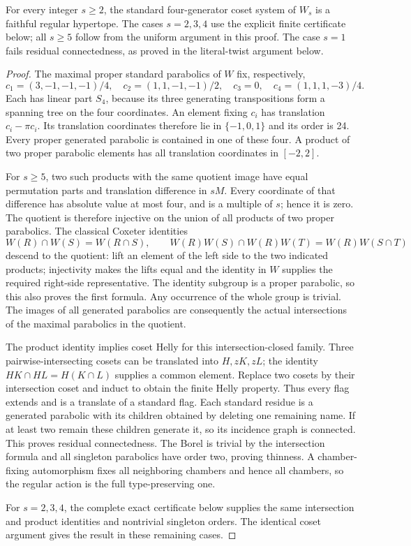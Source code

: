 \begin{theorem}
For every integer $s\geq2$, the standard four-generator coset system
of $W_s$ is a faithful regular hypertope. The cases $s=2,3,4$ use
the explicit finite certificate below; all $s\geq5$ follow from the
uniform argument in this proof. The case $s=1$ fails residual
connectedness, as proved in the literal-twist argument below.
\end{theorem}
\begin{proof}
The maximal proper standard parabolics of $W$ fix, respectively,
\[
 c_1=(3,-1,-1,-1)/4,\quad c_2=(1,1,-1,-1)/2,
 \quad c_3=0,\quad c_4=(1,1,1,-3)/4.
\]
Each has linear part $S_4$, because its three generating
transpositions form a spanning tree on the four coordinates. An
element fixing $c_i$ has translation $c_i-\pi c_i$. Its translation
coordinates therefore lie in $\{-1,0,1\}$ and its order is 24.
Every proper generated parabolic is contained in one of these four.
A product of two proper parabolic elements has all translation
coordinates in $[-2,2]$.

For $s\geq5$, two such products with the same quotient image have
equal permutation parts and translation difference in $sM$. Every
coordinate of that difference has absolute value at most four, and
is a multiple of $s$; hence it is zero. The quotient is therefore
injective on the union of all products of two proper parabolics.
The classical Coxeter identities
\[
 W(R)\cap W(S)=W(R\cap S),\qquad
 W(R)W(S)\cap W(R)W(T)=W(R)W(S\cap T)
\]
descend to the quotient: lift an element of the left side to the
two indicated products; injectivity makes the lifts equal and the
identity in $W$ supplies the required right-side representative.
The identity subgroup is a proper parabolic, so this also proves
the first formula. Any occurrence of the whole group is trivial.
The images of all generated parabolics are consequently the actual
intersections of the maximal parabolics in the quotient.

The product identity implies coset Helly for this intersection-closed
family. Three pairwise-intersecting cosets can be translated into
$H,zK,zL$; the identity $HK\cap HL=H(K\cap L)$ supplies a
common element. Replace two cosets by their intersection coset and
induct to obtain the finite Helly property. Thus every flag extends
and is a translate of a standard flag. Each standard residue is a
generated parabolic with its children obtained by deleting one
remaining name. If at least two remain these children generate it,
so its incidence graph is connected. This proves residual
connectedness. The Borel is trivial by the intersection formula and
all singleton parabolics have order two, proving thinness. A
chamber-fixing automorphism fixes all neighboring chambers and hence
all chambers, so the regular action is the full type-preserving one.

For $s=2,3,4$, the complete exact certificate below supplies the same
intersection and product identities and nontrivial singleton orders.
The identical coset argument gives the result in these remaining cases.
\end{proof}

